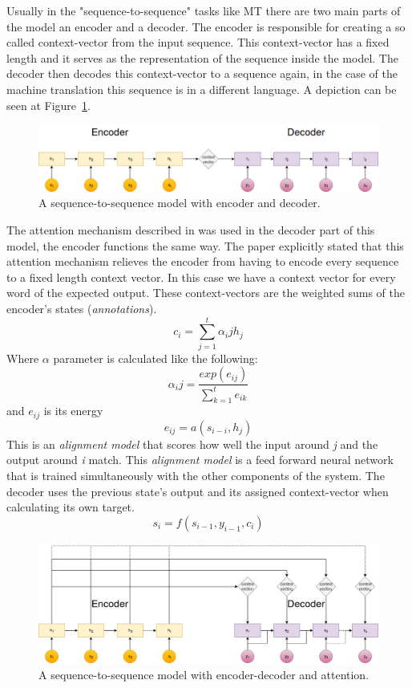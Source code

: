 Usually in the "sequence-to-sequence" tasks like MT there are two main parts of the model an encoder and a decoder. The encoder is responsible for creating a so called context-vector from the input sequence. This context-vector has a fixed length and it serves as the representation of the sequence inside the model. The decoder then decodes this context-vector to a sequence again, in the case of the machine translation this sequence is in a different language. A depiction can be seen at Figure~\ref{fig:seq_to_seq}.
\begin{figure}[!htb]
	\centering
	\includegraphics[scale=0.4]{seq_to_seq.jpg}
	\caption{A sequence-to-sequence model with encoder and decoder.}
	\label{fig:seq_to_seq}
\end{figure}

The attention mechanism described in \cite{Bahdanau:2015} was used in the decoder part of this model, the encoder functions the same way. The paper explicitly stated that this attention mechanism relieves the encoder from having to encode every sequence to a fixed length context vector. In this case we have a context vector for every word of the expected output. These context-vectors are the weighted sums of the encoder's states (\textit{annotations}).
\[c_i = \sum_{j=1}^{t} \alpha_ij h_j\]
Where \(\alpha\) parameter is calculated like the following:
\[\alpha_ij = \frac{exp(e_{ij})}{\sum_{k=1}^{t} e_{ik}} \]
and \(e_{ij}\) is its energy
\[e_{ij} = a(s_{i-i}, h_j)\]
This is an \textit{alignment model} that scores how well the input around \textit{j} and the output around \textit{i} match. This \textit{alignment model} is a feed forward neural network that is trained simultaneously with the other components of the system.
The decoder uses the previous state's output and its assigned context-vector when calculating its own target.
\[s_i = f(s_{i-1}, y_{i-1}, c_i)\]
\begin{figure}[!htb]
	\centering
	\includegraphics[scale=0.4]{attention.jpg}
	\caption{A sequence-to-sequence model with encoder-decoder and attention.}
	\label{fig:attention}
\end{figure}
